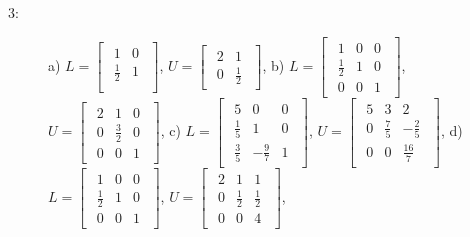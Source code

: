 \documentclass{article}
\begin{document}
\begin{description}
    \item [3:] a) $L = \begin{bmatrix}\begin{array}{rr} 1 & 0\\ \frac{1}{2} & 1\\ \end{array}\end{bmatrix}$, $U = \begin{bmatrix}\begin{array}{rr} 2 & 1\\ 0 & \frac{1}{2} \end{array}\end{bmatrix}$,
    b) $L = \begin{bmatrix}\begin{array}{rrr} 1 & 0 & 0\\ \frac{1}{2} & 1 & 0\\ 0 & 0 & 1 \end{array}\end{bmatrix}$, $U = \begin{bmatrix}\begin{array}{rrr} 2 & 1 & 0\\ 0 & \frac{3}{2} & 0\\ 0 & 0 & 1 \end{array}\end{bmatrix}$,
    c) $L = \begin{bmatrix}\begin{array}{rrr} 5 & 0 & 0\\ \frac{1}{5} & 1 & 0\\ \frac{3}{5} & -\frac{9}{7} & 1 \end{array}\end{bmatrix}$, $U = \begin{bmatrix}\begin{array}{rrr} 5 & 3 & 2\\ 0 & \frac{7}{5} & -\frac{2}{5}\\ 0 & 0 & \frac{16}{7} \end{array}\end{bmatrix}$,
    d) $L = \begin{bmatrix}\begin{array}{rrr} 1 & 0 & 0\\ \frac{1}{2} & 1 & 0\\ 0 & 0 & 1 \end{array}\end{bmatrix}$, $U = \begin{bmatrix}\begin{array}{rrr} 2 & 1 & 1\\ 0 & \frac{1}{2} & \frac{1}{2}\\ 0 & 0 & 4 \end{array}\end{bmatrix}$,
\end{description}
\end{document}
